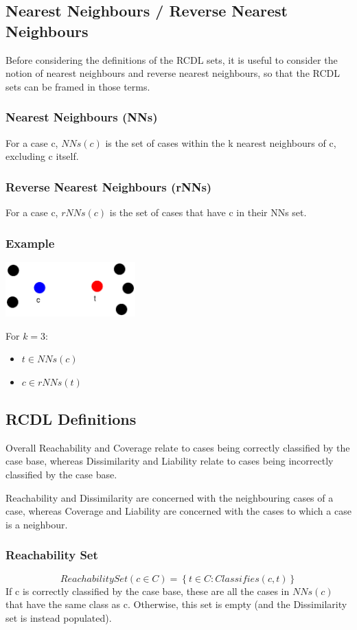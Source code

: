 \documentclass[a4paper,11pt]{report}
\begin{document}
\subsection{Nearest Neighbours / Reverse Nearest Neighbours}
Before considering the definitions of the RCDL sets, it is useful to consider the notion of nearest neighbours and reverse nearest neighbours, so that the RCDL sets can be framed in those terms.

\subsubsection{Nearest Neighbours (NNs)}
For a case c, $ NNs(c) $ is the set of cases within the k nearest neighbours of c, excluding c itself.

\subsubsection{Reverse Nearest Neighbours (rNNs)}
For a case c, $ rNNs(c) $ is the set of cases that have c in their NNs set.

\subsubsection{Example}
\includegraphics[width=5cm]{RcdlNnRnnEg}

For $k=3$:
\begin{itemize}
	\item $ t \in NNs(c) $
	\item $ c \in rNNs(t) $
\end{itemize}

\subsection{RCDL Definitions}
Overall Reachability and Coverage relate to cases being correctly classified by the case base, whereas Dissimilarity and Liability relate to cases being incorrectly classified by the case base.

Reachability and Dissimilarity are concerned with the neighbouring cases of a case, whereas Coverage and Liability are concerned with the cases to which a case is a neighbour.

\subsubsection{Reachability Set}
\[ ReachabilitySet(c \in C) = \left\lbrace t \in C : Classifies(c, t) \right\rbrace \] \cite{Delany2009}
If c is correctly classified by the case base, these are all the cases in $ NNs(c) $ that have the same class as c. Otherwise, this set is empty (and the Dissimilarity set is instead populated).
\end{document}
